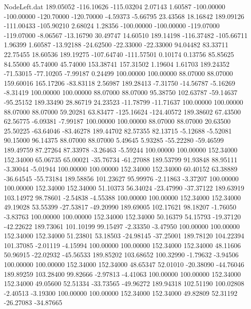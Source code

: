 \begin{filecontents}{NodeLeft.dat}
 189.05052 -116.10626 -115.03204     2.07143    1.60587 -100.00000 -100.00000 -120.70000 -120.70000   -4.59373   -5.66795   23.43568   18.16842
 189.09126 -111.00433 -105.90210     2.68024    1.28356 -100.00000 -100.00000 -119.07000 -119.07000   -8.06567  -13.16790   30.49747   14.60510
 189.14198 -116.37482 -105.66711     1.96399    1.60587  -13.92188  -24.62500  -22.33000  -22.33000   94.04482   83.33711   22.75455   18.60536
 189.19275 -107.64740 -111.57501     0.10174    0.13756   85.85625   84.55000   45.74000   45.74000  153.38741  157.31502    1.19604    1.61703
 189.24352  -71.53015  -77.10205    -7.99187    0.24499  100.00000  100.00000   88.07000   88.07000  159.60016  165.17206  -83.83118    2.56987
 189.28413   -7.31750  -14.56787    -5.16269   -8.31419  100.00000  100.00000   88.07000   88.07000   95.38750  102.63787  -59.14637  -95.25152
 189.33490   28.86719   24.23523   -11.78799  -11.71637  100.00000  100.00000   88.07000   88.07000   59.20281   63.83477 -125.16624 -124.40572
 189.38602   67.43500   62.56775    -6.09381   -7.99187  100.00000  100.00000   88.07000   88.07000   20.63500   25.50225  -63.64046  -83.46278
 189.44702   82.57355   82.13715    -5.12688   -5.52081   90.15000   96.14375   88.07000   88.07000    5.49645    5.93285  -55.22280  -59.46599
 189.49759   87.27264   87.33978    -3.26463   -5.59244  100.00000  100.00000  152.34000  152.34000   65.06735   65.00021  -35.76734  -61.27088
 189.53799   91.93848   88.95111    -3.30044   -5.01944  100.00000  100.00000  152.34000  152.34000   60.40152   63.38889  -36.64545  -55.73184
 189.58856  101.23627   95.99976    -2.11863   -3.37207  100.00000  100.00000  152.34000  152.34000   51.10373   56.34024  -23.47990  -37.37122
 189.63919  103.14972   98.78601    -2.54838   -4.55388  100.00000  100.00000  152.34000  152.34000   49.19028   53.55399  -27.53817  -49.20990
 189.69005  102.17621   98.18207    -1.76050   -3.83763  100.00000  100.00000  152.34000  152.34000   50.16379   54.15793  -19.37120  -42.22622
 189.73061  101.10199   99.15497    -2.33350   -3.47950  100.00000  100.00000  152.34000  152.34000   51.23801   53.18503  -24.98145  -37.25001
 189.78120  104.22394  101.37085    -2.01119   -4.15994  100.00000  100.00000  152.34000  152.34000   48.11606   50.96915  -22.02932  -45.56533
 189.85202  103.68652  100.32990    -1.79632   -3.94506  100.00000  100.00000  152.34000  152.34000   48.65347   52.01010  -20.38090  -44.76046
 189.89259  103.28400   99.82666    -2.97813   -4.41063  100.00000  100.00000  152.34000  152.34000   49.05600   52.51334  -33.73565  -49.96272
 189.94318  102.51190  100.02808    -2.40513   -3.19300  100.00000  100.00000  152.34000  152.34000   49.82809   52.31192  -26.27083  -34.87665

\end{filecontents}
